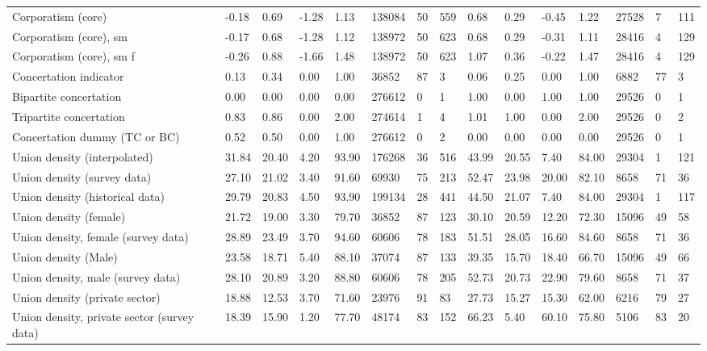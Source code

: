 \begin{longtable}{lllllllllllllll}
Corporatism (core) & -0.18 & 0.69 & -1.28 & 1.13 & 138084 & 50 & 559 & 0.68 & 0.29 & -0.45 & 1.22 & 27528 & 7 & 111\\
\addlinespace
Corporatism (core), sm & -0.17 & 0.68 & -1.28 & 1.12 & 138972 & 50 & 623 & 0.68 & 0.29 & -0.31 & 1.11 & 28416 & 4 & 129\\
Corporatism (core), sm f & -0.26 & 0.88 & -1.66 & 1.48 & 138972 & 50 & 623 & 1.07 & 0.36 & -0.22 & 1.47 & 28416 & 4 & 129\\
Concertation indicator & 0.13 & 0.34 & 0.00 & 1.00 & 36852 & 87 & 3 & 0.06 & 0.25 & 0.00 & 1.00 & 6882 & 77 & 3\\
Bipartite concertation & 0.00 & 0.00 & 0.00 & 0.00 & 276612 & 0 & 1 & 1.00 & 0.00 & 1.00 & 1.00 & 29526 & 0 & 1\\
Tripartite concertation & 0.83 & 0.86 & 0.00 & 2.00 & 274614 & 1 & 4 & 1.01 & 1.00 & 0.00 & 2.00 & 29526 & 0 & 2\\
\addlinespace
Concertation dummy (TC or BC) & 0.52 & 0.50 & 0.00 & 1.00 & 276612 & 0 & 2 & 0.00 & 0.00 & 0.00 & 0.00 & 29526 & 0 & 1\\
Union density (interpolated) & 31.84 & 20.40 & 4.20 & 93.90 & 176268 & 36 & 516 & 43.99 & 20.55 & 7.40 & 84.00 & 29304 & 1 & 121\\
Union density (survey data) & 27.10 & 21.02 & 3.40 & 91.60 & 69930 & 75 & 213 & 52.47 & 23.98 & 20.00 & 82.10 & 8658 & 71 & 36\\
Union density (historical data) & 29.79 & 20.83 & 4.50 & 93.90 & 199134 & 28 & 441 & 44.50 & 21.07 & 7.40 & 84.00 & 29304 & 1 & 117\\
Union density (female) & 21.72 & 19.00 & 3.30 & 79.70 & 36852 & 87 & 123 & 30.10 & 20.59 & 12.20 & 72.30 & 15096 & 49 & 58\\
\addlinespace
Union density, female (survey data) & 28.89 & 23.49 & 3.70 & 94.60 & 60606 & 78 & 183 & 51.51 & 28.05 & 16.60 & 84.60 & 8658 & 71 & 36\\
Union density (Male) & 23.58 & 18.71 & 5.40 & 88.10 & 37074 & 87 & 133 & 39.35 & 15.70 & 18.40 & 66.70 & 15096 & 49 & 66\\
Union density, male (survey data) & 28.10 & 20.89 & 3.20 & 88.80 & 60606 & 78 & 205 & 52.73 & 20.73 & 22.90 & 79.60 & 8658 & 71 & 37\\
Union density (private sector) & 18.88 & 12.53 & 3.70 & 71.60 & 23976 & 91 & 83 & 27.73 & 15.27 & 15.30 & 62.00 & 6216 & 79 & 27\\
Union density, private sector (survey data) & 18.39 & 15.90 & 1.20 & 77.70 & 48174 & 83 & 152 & 66.23 & 5.40 & 60.10 & 75.80 & 5106 & 83 & 20\\

\end{longtable}

